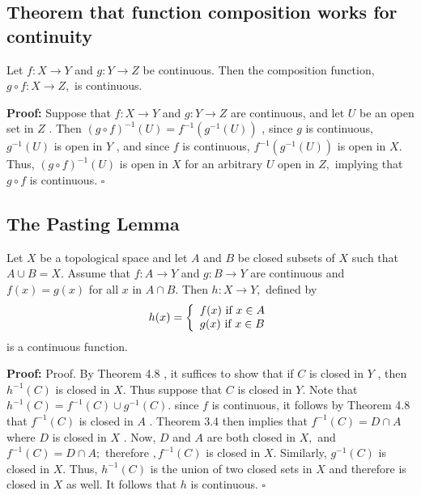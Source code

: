 \documentclass[12pt]{article}
\newenvironment{proofed}[1][]{\par \medskip \noindent \textbf{#1 Proof: }}{\hfill$\square$}
\begin{document}
	\subsection{Theorem that function composition works for continuity}
		Let $f : X \rightarrow Y$ and $g : Y \rightarrow Z$ be continuous. Then the
		composition function, $g \circ f : X \rightarrow Z ,$ is continuous.
		\begin{proofed}
			Suppose that $f : X \rightarrow Y$ and $g : Y \rightarrow Z$ are continuous,
			and let $U$ be an open set in $Z$ . Then $( g \circ f ) ^ { - 1 } ( U ) = f ^ { - 1 } \left( g ^ { - 1 } ( U ) \right)$ ,
			since $g$ is continuous, $g ^ { - 1 } ( U )$ is open in $Y$ , and since $f$ is continuous, $f ^ { - 1 } \left( g ^ { - 1 } ( U ) \right)$ is open in $X .$ Thus, $( g \circ f ) ^ { - 1 } ( U )$ is open in $X$ for an arbitrary $U$ open in $Z ,$ implying that $g \circ f$ is continuous.
		\end{proofed}
	\subsection{The Pasting Lemma}
		Let $ X $ be a topological space and let $ A $ and $B$ be closed subsets of $X$ such that $A \cup B = X .$ Assume that $f : A \rightarrow Y$ and $g : B \rightarrow Y$ are continuous and $f ( x ) = g ( x )$ for all $x$ in $A \cap B .$ Then $h : X \rightarrow Y ,$ defined by
			\[h ( x ) = \left\{ \begin{array} { l l } { f ( x ) \text { if } x \in A } \\ { g ( x ) \text { if } x \in B } \end{array} \right.\]
		is a continuous function.
		\begin{proofed}
			Proof. By Theorem 4.8 , it suffices to show that if $C$ is closed in $Y$ ,
			then $h ^ { - 1 } ( C )$ is closed in $X .$ Thus suppose that $C$ is closed in $Y .$ Note
			that $h ^ { - 1 } ( C ) = f ^ { - 1 } ( C ) \cup g ^ { - 1 } ( C ) .$ since $f$ is continuous, it follows by Theorem 4.8 that $f ^ { - 1 } ( C )$ is closed in $A$ . Theorem 3.4 then implies that
			$f ^ { - 1 } ( C ) = D \cap A$ where $D$ is closed in $X$ . Now, $D$ and $A$ are both closed
			in $X ,$ and $f ^ { - 1 } ( C ) = D \cap A ;$ therefore $, f ^ { - 1 } ( C )$ is closed in $X .$ Similarly, $g ^ { - 1 } ( C )$ is closed in $X .$ Thus, $h ^ { - 1 } ( C )$ is the union of two closed sets in
			$X$ and therefore is closed in $X$ as well. It follows that $h$ is continuous. 
		\end{proofed}
\end{document}
